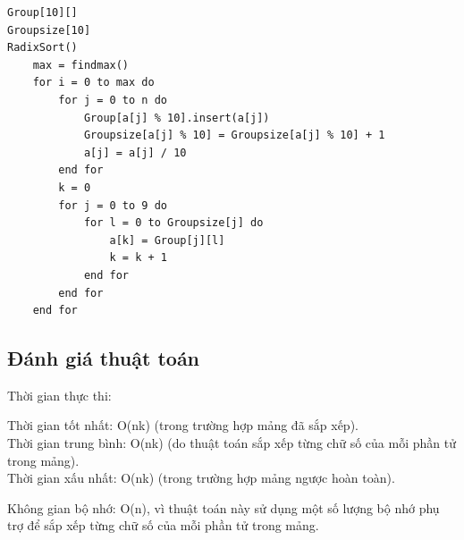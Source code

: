 \documentclass[12pt,a4paper]{report}
\begin{document}
\begin{lstlisting}
Group[10][]
Groupsize[10]
RadixSort()
    max = findmax()
    for i = 0 to max do
        for j = 0 to n do
            Group[a[j] % 10].insert(a[j])
            Groupsize[a[j] % 10] = Groupsize[a[j] % 10] + 1
            a[j] = a[j] / 10
        end for
        k = 0
        for j = 0 to 9 do
            for l = 0 to Groupsize[j] do
                a[k] = Group[j][l]
                k = k + 1
            end for
        end for
    end for
\end{lstlisting}

\subsection{ Đánh giá thuật toán}

{Thời gian thực thi:

\hspace{0.5cm} Thời gian tốt nhất: O(nk) (trong trường hợp mảng đã sắp xếp).\\

\hspace{0.5cm} Thời gian trung bình: O(nk) (do thuật toán sắp xếp từng chữ số của mỗi phần tử trong mảng).\\

\hspace{0.5cm} Thời gian xấu nhất: O(nk) (trong trường hợp mảng ngược hoàn toàn).\\}

{Không gian bộ nhớ: O(n), vì thuật toán này sử dụng một số lượng bộ nhớ phụ trợ để sắp xếp từng chữ số của mỗi phần tử trong mảng.}
\end{document}
